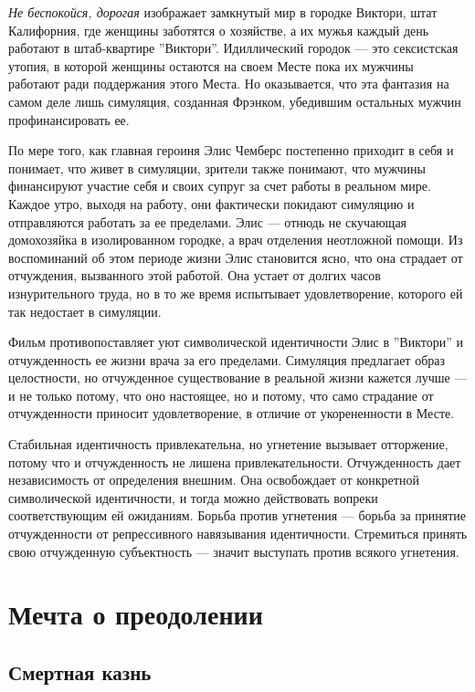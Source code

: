 \documentclass[12pt]{book}
\begin{document}
\textit{Не беспокойся, дорогая} изображает замкнутый мир в городке Виктори, штат Калифорния, где женщины заботятся о хозяйстве, а их мужья каждый день работают в штаб-квартире ''Виктори''. Идиллический городок --- это сексистская утопия, в которой женщины остаются на своем Месте пока их мужчины работают ради поддержания этого Места. Но оказывается, что эта фантазия на самом деле лишь симуляция, созданная Фрэнком, убедившим остальных мужчин профинансировать ее.

По мере того, как главная героиня Элис Чемберс постепенно приходит в себя и понимает, что живет в симуляции, зрители также понимают, что мужчины финансируют участие себя и своих супруг за счет работы в реальном мире. Каждое утро, выходя на работу, они фактически покидают симуляцию и отправляются работать за ее пределами. Элис --- отнюдь не скучающая домохозяйка в изолированном городке, а врач отделения неотложной помощи. Из воспоминаний об этом периоде жизни Элис становится ясно, что она страдает от отчуждения, вызванного этой работой. Она устает от долгих часов изнурительного труда, но в то же время испытывает удовлетворение, которого ей так недостает в симуляции.

Фильм противопоставляет уют символической идентичности Элис в ''Виктори'' и отчужденность ее жизни врача за его пределами. Симуляция предлагает образ целостности, но отчужденное существование в реальной жизни кажется лучше --- и не только потому, что оно настоящее, но и потому, что само страдание от отчужденности приносит удовлетворение, в отличие от укорененности в Месте.

Стабильная идентичность привлекательна, но угнетение вызывает отторжение, потому что и отчужденность не лишена привлекательности. Отчужденность дает независимость от определения внешним. Она освобождает от конкретной символической идентичности, и тогда можно действовать вопреки соответствующим ей ожиданиям. Борьба против угнетения --- борьба за принятие отчужденности от репрессивного навязывания идентичности. Стремиться принять свою отчужденную субъектность --- значит выступать против всякого угнетения.

\chapter{Мечта о преодолении}

\section{Смертная казнь}
\end{document}

